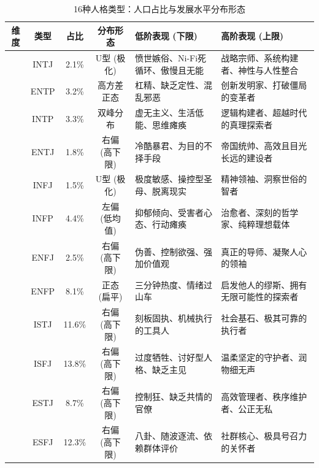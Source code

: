 \documentclass[UTF8,letter,10pt]{ctexart}
\begin{document}
\begin{table}[h!]
    \caption{16种人格类型：人口占比与发展水平分布形态}
    \centering
    \renewcommand{\arraystretch}{1.2} %
    \begin{tabular}{c c c c L{4.2cm} L{4.2cm}}
        \toprule
        \textbf{维度} & \textbf{类型} & \textbf{占比} & \textbf{分布形态} & \textbf{低阶表现 (下限)} & \textbf{高阶表现 (上限)} \\
        \midrule

        & INTJ & 2.1\% & U型 (极化) & 愤世嫉俗、Ni-Fi死循环、傲慢且无能 & 战略宗师、系统构建者、神性与人性整合 \\
        & ENTP & 3.2\% & 高方差正态 & 杠精、缺乏定性、混乱邪恶 & 创新发明家、打破僵局的变革者 \\
        & INTP & 3.3\% & 双峰分布 & 虚无主义、生活低能、思维瘫痪 & 逻辑构建者、超越时代的真理探索者 \\
        & ENTJ & 1.8\% & 右偏 (高下限) & 冷酷暴君、为目的不择手段 & 帝国统帅、高效且目光长远的建设者 \\
        \midrule

        & INFJ & 1.5\% & U型 (极化) & 极度敏感、操控型圣母、脱离现实 & 精神领袖、洞察世俗的智者 \\
        & INFP & 4.4\% & 左偏 (低均值) & 抑郁倾向、受害者心态、行动瘫痪 & 治愈者、深刻的哲学家、纯粹理想载体 \\
        & ENFJ & 2.5\% & 右偏 (高下限) & 伪善、控制欲强、强加价值观 & 真正的导师、凝聚人心的领袖 \\
        & ENFP & 8.1\% & 正态 (扁平) & 三分钟热度、情绪过山车 & 启发他人的缪斯、拥有无限可能性的探索者 \\
        \midrule

        & ISTJ & 11.6\% & 右偏 (高下限) & 刻板固执、机械执行的工具人 & 社会基石、极其可靠的执行者 \\
        & ISFJ & 13.8\% & 右偏 (高下限) & 过度牺牲、讨好型人格、缺乏主见 & 温柔坚定的守护者、润物细无声 \\
        & ESTJ & 8.7\% & 右偏 (高下限) & 控制狂、缺乏共情的官僚 & 高效管理者、秩序维护者、公正无私 \\
        & ESFJ & 12.3\% & 右偏 (高下限) & 八卦、随波逐流、依赖群体评价 & 社群核心、极具号召力的关怀者 \\
        \midrule


\end{tabular}
\end{table}
\end{document}
